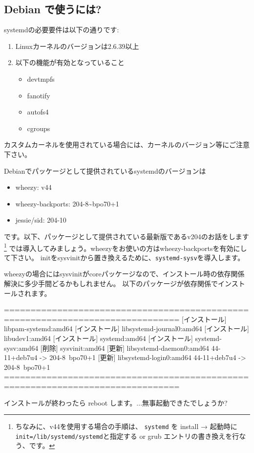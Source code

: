 \documentclass[mingoth,a4paper]{jsarticle}
\begin{document}
\subsection{Debian で使うには?}

systemdの必要要件は以下の通りです:
\begin{enumerate}
\item Linuxカーネルのバージョンは2.6.39以上
\item 以下の機能が有効となっていること
  \begin{itemize}
  \item devtmpfs
  \item fanotify
  \item autofs4
  \item cgroups
  \end{itemize}
\end{enumerate}
カスタムカーネルを使用されている場合には、カーネルのバージョン等にご注意下さい。

Debianでパッケージとして提供されているsystemdのバージョンは
\begin{itemize}
\item wheezy: v44
\item wheezy-backports: 204-8\~{}bpo70+1
\item jessie/sid: 204-10
\end{itemize}
です。以下、パッケージとして提供されている最新版であるv204のお話をします\footnote{%
  ちなみに、v44を使用する場合の手順は、
  \texttt{systemd} を install →
  起動時に \texttt{init=/lib/systemd/systemd}と指定する or grub エントリの書き換えを行なう、です。
}
では導入してみましょう。wheezyをお使いの方はwheezy-backportsを有効にして下さい。
initをsysvinitから置き換えるために、\texttt{systemd-sysv}を導入します。
\begin{commandline}
\end{commandline}
wheezyの場合にはsysvinitがcoreパッケージなので、インストール時の依存関係解決に多少手間どるかもしれません。
以下のパッケージが依存関係でインストールされます。
\begin{commandline}
===============================================================================
[インストール] libpam-systemd:amd64
[インストール] libsystemd-journal0:amd64
[インストール] libudev1:amd64
[インストール] systemd:amd64
[インストール] systemd-sysv:amd64
[削除] sysvinit:amd64
[更新] libsystemd-daemon0:amd64 44-11+deb7u4 -> 204-8~bpo70+1
[更新] libsystemd-login0:amd64 44-11+deb7u4 -> 204-8~bpo70+1
===============================================================================
\end{commandline}
インストールが終わったら reboot します。...無事起動できたでしょうか?
\end{document}
